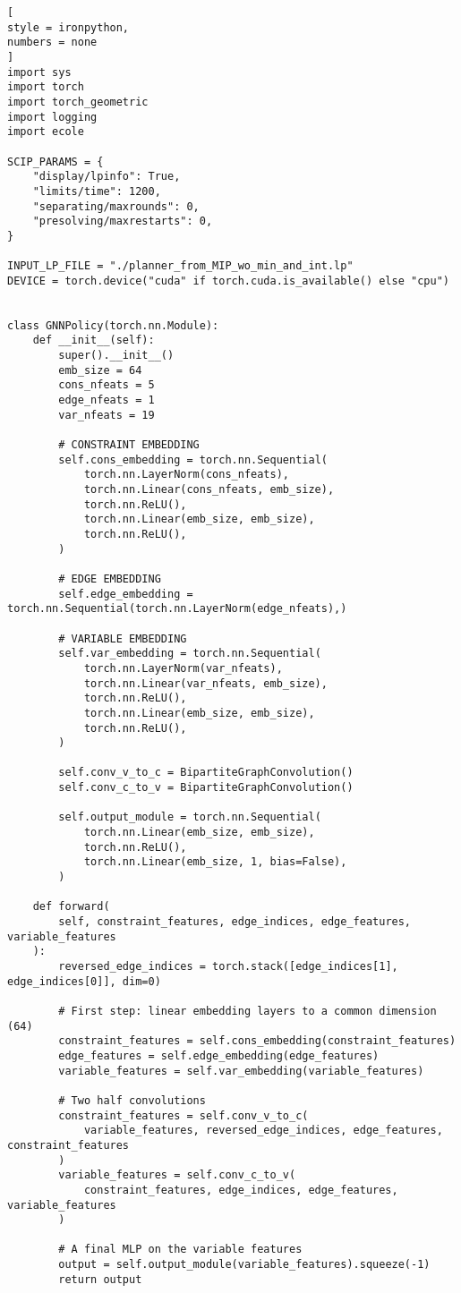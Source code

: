 \documentclass[%
	11pt,
	a4paper,
	utf8,
		]{article}
\begin{document}
\begin{lstlisting}[
style = ironpython,
numbers = none
]
import sys
import torch
import torch_geometric
import logging
import ecole

SCIP_PARAMS = {
	"display/lpinfo": True,
	"limits/time": 1200,
	"separating/maxrounds": 0,
	"presolving/maxrestarts": 0,
}

INPUT_LP_FILE = "./planner_from_MIP_wo_min_and_int.lp"
DEVICE = torch.device("cuda" if torch.cuda.is_available() else "cpu")


class GNNPolicy(torch.nn.Module):
	def __init__(self):
		super().__init__()
		emb_size = 64
		cons_nfeats = 5
		edge_nfeats = 1
		var_nfeats = 19

		# CONSTRAINT EMBEDDING
		self.cons_embedding = torch.nn.Sequential(
			torch.nn.LayerNorm(cons_nfeats),
			torch.nn.Linear(cons_nfeats, emb_size),
			torch.nn.ReLU(),
			torch.nn.Linear(emb_size, emb_size),
			torch.nn.ReLU(),
		)

		# EDGE EMBEDDING
		self.edge_embedding = torch.nn.Sequential(torch.nn.LayerNorm(edge_nfeats),)

		# VARIABLE EMBEDDING
		self.var_embedding = torch.nn.Sequential(
			torch.nn.LayerNorm(var_nfeats),
			torch.nn.Linear(var_nfeats, emb_size),
			torch.nn.ReLU(),
			torch.nn.Linear(emb_size, emb_size),
			torch.nn.ReLU(),
		)

		self.conv_v_to_c = BipartiteGraphConvolution()
		self.conv_c_to_v = BipartiteGraphConvolution()

		self.output_module = torch.nn.Sequential(
			torch.nn.Linear(emb_size, emb_size),
			torch.nn.ReLU(),
			torch.nn.Linear(emb_size, 1, bias=False),
		)

	def forward(
		self, constraint_features, edge_indices, edge_features, variable_features
	):
		reversed_edge_indices = torch.stack([edge_indices[1], edge_indices[0]], dim=0)

		# First step: linear embedding layers to a common dimension (64)
		constraint_features = self.cons_embedding(constraint_features)
		edge_features = self.edge_embedding(edge_features)
		variable_features = self.var_embedding(variable_features)

		# Two half convolutions
		constraint_features = self.conv_v_to_c(
			variable_features, reversed_edge_indices, edge_features, constraint_features
		)
		variable_features = self.conv_c_to_v(
			constraint_features, edge_indices, edge_features, variable_features
		)

		# A final MLP on the variable features
		output = self.output_module(variable_features).squeeze(-1)
		return output



\end{lstlisting}
\end{document}
